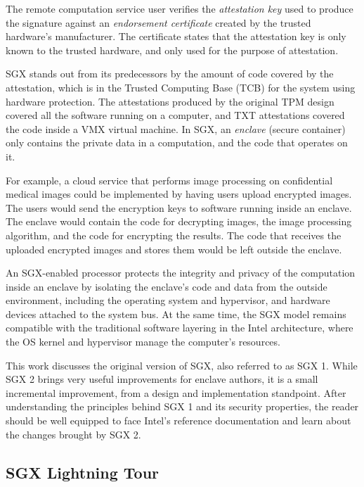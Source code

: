The remote computation service user verifies the \textit{attestation key} used
to produce the signature against an \textit{endorsement certificate} created by
the trusted hardware's manufacturer. The certificate states that the
attestation key is only known to the trusted hardware, and only used for the
purpose of attestation.

SGX stands out from its predecessors by the amount of code covered by the
attestation, which is in the Trusted Computing Base (TCB) for the system using
hardware protection. The attestations produced by the original TPM design
covered all the software running on a computer, and TXT attestations covered
the code inside a VMX \cite{uhlig2005vmx} virtual machine. In SGX, an
\textit{enclave} (secure container) only contains the private data in a
computation, and the code that operates on it.

For example, a cloud service that performs image processing on confidential
medical images could be implemented by having users upload encrypted images.
The users would send the encryption keys to software running inside an enclave.
The enclave would contain the code for decrypting images, the image processing
algorithm, and the code for encrypting the results. The code that receives the
uploaded encrypted images and stores them would be left outside the enclave.

An SGX-enabled processor protects the integrity and privacy of the computation
inside an enclave by isolating the enclave's code and data from the outside
environment, including the operating system and hypervisor, and hardware
devices attached to the system bus. At the same time, the SGX model remains
compatible with the traditional software layering in the Intel architecture,
where the OS kernel and hypervisor manage the computer's resources.

This work discusses the original version of SGX, also referred to as SGX 1.
While SGX 2 brings very useful improvements for enclave authors, it is a small
incremental improvement, from a design and implementation standpoint. After
understanding the principles behind SGX 1 and its security properties, the
reader should be well equipped to face Intel's reference documentation and
learn about the changes brought by SGX 2.


\subsection{SGX Lightning Tour}
\label{sec:intro_sgx}

